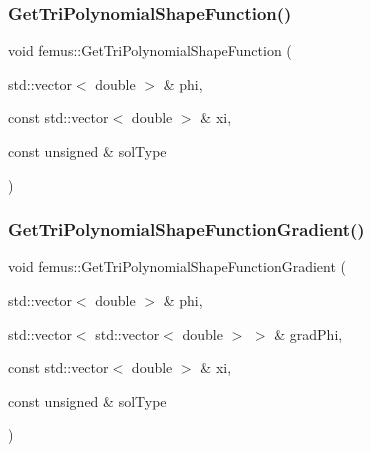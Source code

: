 \subsubsection{\texorpdfstring{Get\+Tri\+Polynomial\+Shape\+Function()}{GetTriPolynomialShapeFunction()}}
{\footnotesize\ttfamily void femus\+::\+Get\+Tri\+Polynomial\+Shape\+Function (\begin{DoxyParamCaption}\item[{std\+::vector$<$ double $>$ \&}]{phi,  }\item[{const std\+::vector$<$ double $>$ \&}]{xi,  }\item[{const unsigned \&}]{sol\+Type }\end{DoxyParamCaption})}

\mbox{\label{namespacefemus_ab62adc71e5f5c682a2590ebc0cdc0a5a}} 
\subsubsection{\texorpdfstring{Get\+Tri\+Polynomial\+Shape\+Function\+Gradient()}{GetTriPolynomialShapeFunctionGradient()}}
{\footnotesize\ttfamily void femus\+::\+Get\+Tri\+Polynomial\+Shape\+Function\+Gradient (\begin{DoxyParamCaption}\item[{std\+::vector$<$ double $>$ \&}]{phi,  }\item[{std\+::vector$<$ std\+::vector$<$ double $>$ $>$ \&}]{grad\+Phi,  }\item[{const std\+::vector$<$ double $>$ \&}]{xi,  }\item[{const unsigned \&}]{sol\+Type }\end{DoxyParamCaption})}

\mbox{\label{namespacefemus_a5a10776bad6d5e3320121c6b6d9ef723}} 
